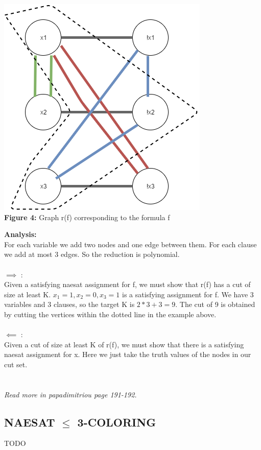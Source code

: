\begin{center}
\includegraphics[scale=0.5]{NAESATtoMAXCUT}\\
\textbf{Figure 4:} Graph r(f) corresponding to the formula f
\end{center}
\textbf{Analysis:}\\
For each variable we add two nodes and one edge between them. For each clause we add at most 3 edges. So the reduction is polynomial.\\\\
$\implies$ :\\
Given a satisfying naesat assignment for f, we must show that r(f) has a cut of size at least K. $x_1 = 1, x_2 = 0, x_3 = 1$ is a satisfying assignment for f. We have 3 variables and 3 clauses, so the target K is $2*3+3 = 9$. The cut of 9 is obtained by cutting the vertices within the dotted line in the example above. 
\\\\
$\impliedby$ :\\
Given a cut of size at least K of r(f), we must show that there is a satisfying naesat assignment for x. Here we just take the truth values of the nodes in our cut set.
\\\\\\
\textit{Read more in papadimitriou page 191-192.}
\subsection{NAESAT $\le$ 3-COLORING}
TODO
\newpage

